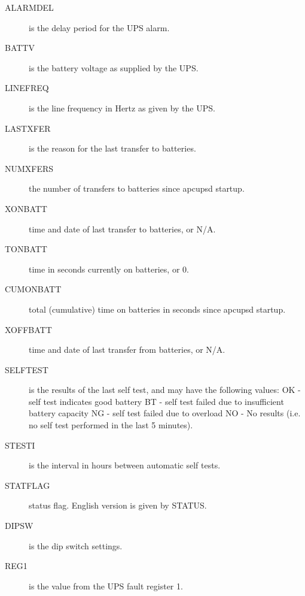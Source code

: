 {{{{{{{{{{{{{{{\begin{description}
\item [ALARMDEL]
   is the delay period for the UPS alarm.  

\item [BATTV]
   is the battery voltage as supplied by the UPS.  

\item [LINEFREQ]
   is the line frequency in Hertz as given by the UPS.  

\item [LASTXFER]
   is the reason for the last transfer to batteries.  

\item [NUMXFERS]
   the number of transfers to batteries since apcupsd startup.  

\item [XONBATT]
   time and date of last transfer to batteries, or N/A.  

\item [TONBATT]
   time in seconds currently on batteries, or 0.  

\item [CUMONBATT]
   total (cumulative) time on batteries in seconds since apcupsd startup.  

\item [XOFFBATT]
   time and date of last transfer from batteries, or N/A.  

\item [SELFTEST]
   is the results of the last self test, and may have the following values: OK -
self test indicates good battery BT - self test failed due to insufficient
battery capacity NG - self test failed due to overload NO - No results (i.e.
no self test performed in the last 5 minutes).  

\item [STESTI]
   is the interval in hours between automatic self tests.  

\item [STATFLAG]
   status flag. English version is given by STATUS.  

\item [DIPSW]
   is the dip switch settings.  

\item [REG1]
   is the value from the UPS fault register 1.  


\end{description}}}}}}}}}}}}}}}}
